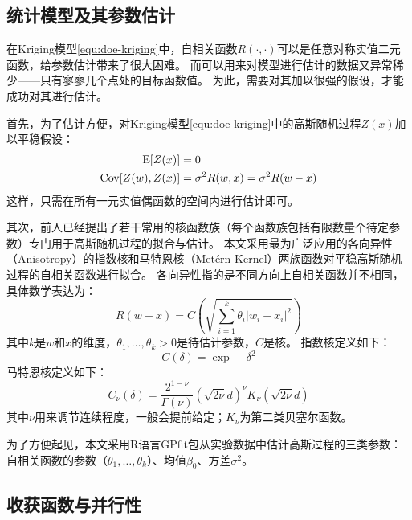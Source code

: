 \documentclass[index]{subfiles}
\begin{document}
\subsection{统计模型及其参数估计}\label{ssec:bgo-mdl}
在Kriging模型\cref{equ:doe-kriging}中，自相关函数$R(\cdot,\cdot)$可以是任意对称实值二元函数，给参数估计带来了很大困难。
而可以用来对模型进行估计的数据又异常稀少——只有寥寥几个点处的目标函数值。
为此，需要对其加以很强的假设，才能成功对其进行估计。

首先，为了估计方便，对Kriging模型\cref{equ:doe-kriging}中的高斯随机过程$Z(x)$加以平稳假设：
\begin{align}\label{equ:bgo-gp}
  \E{Z(x)} &= 0 \\
  \Cov{Z(w)}{Z(x)} &= \sigma^2 R(w, x) = \sigma^2 R(w - x)
\end{align}
这样，只需在所有一元实值偶函数的空间内进行估计即可。

其次，前人已经提出了若干常用的核函数族（每个函数族包括有限数量个待定参数）专门用于高斯随机过程的拟合与估计。
本文采用最为广泛应用的各向异性（Anisotropy）的指数核和马特恩核（Met\'{e}rn Kernel）两族函数对平稳高斯随机过程的自相关函数进行拟合。
各向异性指的是不同方向上自相关函数并不相同，具体数学表达为：
\begin{equation}\label{equ:bgo-ansi}
  R(w - x) = C\!\left(\sqrt{\textstyle \sum_{i=1}^{k}\theta_i \left| w_i - x_i \right|^2}\right)
\end{equation}
其中$k$是$w$和$x$的维度，$\theta_1,\ldots,\theta_k>0$是待估计参数，$C$是核。
指数核定义如下：
\begin{equation}\label{equ:bgo-exp}
  C(\delta) = \exp -\delta^2
\end{equation}
马特恩核定义如下：
\begin{equation}\label{equ:bgo-matern}
  C_\nu(\delta) = \frac{2^{1-\nu}}{\Gamma(\nu)} \left(\sqrt{2\nu} d\right)^\nu K_\nu\!\left(\sqrt{2\nu} d\right)
\end{equation}
其中$\nu$用来调节连续程度，一般会提前给定；$K_\nu$为第二类贝塞尔函数。

为了方便起见，本文采用R语言GPfit包\cite{macdonald2015}从实验数据中估计高斯过程的三类参数：
自相关函数的参数（$\theta_1,\ldots,\theta_k$）、均值$\beta_0$、方差$\sigma^2$。

\subsection{收获函数与并行性}\label{ssec:bgo-acq}
\end{document}
